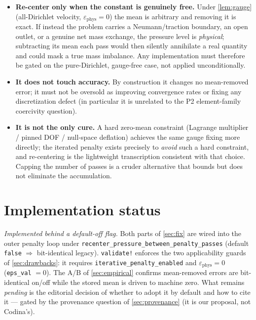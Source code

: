 \documentclass[11pt]{article}
\theoremstyle{plain}
\theoremstyle{remark}
\newcommand{\ephys}{\varepsilon_{\mathrm{phys}}}
\begin{document}
\begin{itemize}
\item \textbf{Re-center only when the constant is genuinely free.} Under \cref{lem:gauge} (all-Dirichlet
velocity, $\ephys=0$) the mean is arbitrary and removing it is exact. If instead the problem carries a
Neumann/traction boundary, an open outlet, or a genuine net mass exchange, the pressure level is
\emph{physical}; subtracting its mean each pass would then silently annihilate a real quantity and could
mask a true mass imbalance. Any implementation must therefore be gated on the pure-Dirichlet,
gauge-free case, not applied unconditionally.
\item \textbf{It does not touch accuracy.} By construction it changes no mean-removed error; it must not
be oversold as improving convergence rates or fixing any discretization defect (in particular it is
unrelated to the P2 element-family coercivity question).
\item \textbf{It is not the only cure.} A hard zero-mean constraint (Lagrange multiplier / pinned DOF /
null-space deflation) achieves the same gauge fixing more directly; the iterated penalty exists precisely
to \emph{avoid} such a hard constraint, and re-centering is the lightweight transcription consistent with
that choice. Capping the number of passes is a cruder alternative that bounds but does not eliminate the
accumulation.
\end{itemize}

\section*{Implementation status}
\emph{Implemented behind a default-off flag.} Both parts of \cref{sec:fix} are wired into the outer
penalty loop under \texttt{recenter\_pressure\_between\_penalty\_passes} (default \texttt{false}
$\Rightarrow$ bit-identical legacy). \texttt{validate!} enforces the two applicability guards of
\cref{sec:drawbacks}: it requires \texttt{iterative\_penalty\_enabled} and $\ephys=0$ (\texttt{eps\_val}
$=0$). The A/B of \cref{sec:empirical} confirms mean-removed errors are bit-identical on/off while the
stored mean is driven to machine zero. What remains \emph{pending} is the editorial decision of whether to
adopt it by default and how to cite it --- gated by the provenance question of \cref{sec:provenance} (it
is our proposal, not Codina's).
\end{document}
